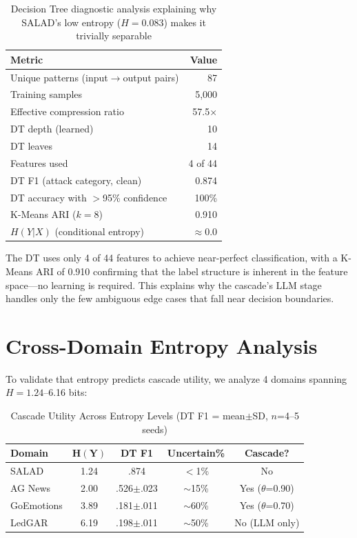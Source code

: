 \documentclass[review,3p]{elsarticle}
\begin{document}
\begin{table}[!ht]
\centering
\caption{Decision Tree diagnostic analysis explaining why SALAD's low entropy ($H=0.083$) makes it trivially separable}
\label{tab:diagnostic}
\begin{tabular}{lr}
\toprule
\textbf{Metric} & \textbf{Value} \\
\midrule
Unique patterns (input$\to$output pairs) & 87 \\
Training samples & 5,000 \\
Effective compression ratio & 57.5$\times$ \\
DT depth (learned) & 10 \\
DT leaves & 14 \\
Features used & 4 of 44 \\
DT F1 (attack category, clean) & 0.874 \\
DT accuracy with $>$95\% confidence & 100\% \\
K-Means ARI ($k=8$) & 0.910 \\
$H(Y|X)$ (conditional entropy) & $\approx 0.0$ \\
\bottomrule
\end{tabular}
\end{table}

The DT uses only 4 of 44 features to achieve near-perfect classification, with a K-Means ARI of 0.910 confirming that the label structure is inherent in the feature space---no learning is required. This explains why the cascade's LLM stage handles only the few ambiguous edge cases that fall near decision boundaries.

\section{Cross-Domain Entropy Analysis}

To validate that entropy predicts cascade utility, we analyze 4 domains spanning $H=1.24$--6.16 bits:

\begin{table}[!ht]
\centering
\caption{Cascade Utility Across Entropy Levels (DT F1 = mean$\pm$SD, $n$=4--5 seeds)}
\label{tab:entropy}
\begin{tabular}{lcccc}
\toprule
\textbf{Domain} & $\mathbf{H(Y)}$ & \textbf{DT F1} & \textbf{Uncertain\%} & \textbf{Cascade?} \\
\midrule
SALAD & 1.24 & .874 & $<$1\% & No \\
AG News & 2.00 & .526$\pm$.023 & $\sim$15\% & Yes ($\theta$=0.90) \\
GoEmotions & 3.89 & .181$\pm$.011 & $\sim$60\% & Yes ($\theta$=0.70) \\
LedGAR & 6.19 & .198$\pm$.011 & $\sim$50\% & No (LLM only) \\
\bottomrule
\end{tabular}
\end{table}
\end{document}
